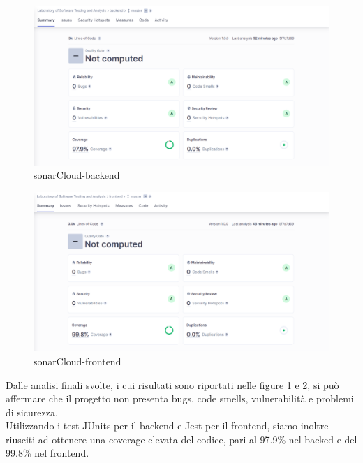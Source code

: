 \documentclass[a4paper,12pt]{report}
\begin{document}
		\begin{figure}[!h]
			\centering
			\includegraphics[width=1\linewidth]{image/sonarCloud-backend.png}
			\caption{sonarCloud-backend}\label{fig:sonarCloud-backend}
		\end{figure}	
		\begin{figure}[!h]
			\centering
			\includegraphics[width=1\linewidth]{image/sonarCloud-frontend.png}
			\caption{sonarCloud-frontend}\label{fig:sonarCloud-frontend}
		\end{figure}
		\newpage 
Dalle analisi finali svolte, i cui risultati sono riportati nelle figure \ref{fig:sonarCloud-backend} e \ref{fig:sonarCloud-frontend}, si può affermare che il progetto non presenta bugs, code smells, vulnerabilità e problemi di sicurezza.\\
Utilizzando i test JUnits per il backend e Jest per il frontend, siamo inoltre riusciti ad ottenere una coverage elevata del codice, pari al 97.9\% nel backed e del 99.8\% nel frontend.


\newpage
\end{document}
